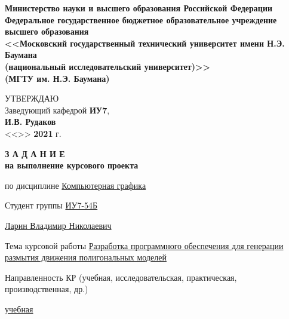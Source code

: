 \thispagestyle{empty}
\begin{center}
    \fontsize{11pt}{0.3\baselineskip}\selectfont \textbf{Министерство науки и высшего образования Российской Федерации \\ Федеральное государственное бюджетное образовательное учреждение \\ высшего образования \\ <<Московский государственный технический университет имени Н.Э. Баумана \\ (национальный исследовательский университет)>> \\ (МГТУ им. Н.Э. Баумана)}
    \makebox[\linewidth]{\rule{\textwidth}{3pt}}
    \begin{flushright}
        \fontsize{11pt}{0.5\baselineskip}\selectfont
            УТВЕРЖДАЮ \\ Заведующий кафедрой \textbf{ИУ7}, \\
            \uline{\mbox{\hspace*{2cm}}}
            \textbf{И.В. Рудаков} \\
            <<\uline{\mbox{\hspace*{1cm}}}>>
            \uline{\mbox{\hspace*{2.5cm}}}
            \textbf{2021} г.
    \end{flushright}
\end{center}


\begin{center}
    \fontsize{18pt}{0.6\baselineskip}\selectfont \textbf{З А Д А Н И Е}\\
    \fontsize{16pt}{0.6\baselineskip}\selectfont \textbf{на выполнение курсового проекта}
\end{center}

\normalsize

\begingroup
\fontsize{12pt}{0.6\baselineskip}\selectfont
\setlength{\parskip}{0.1em}
\setlength{\parindent}{0em}
по дисциплине \uline{\hfill Компьютерная графика \hfill}

Студент группы \uline{\hfill ИУ7-54Б \hfill}

\uline{\hfill Ларин Владимир Николаевич \hfill}

Тема курсовой работы \uline{Разработка   программного   обеспечения   для генерации размытия движения полигональных моделей \hfill}

Направленность КР (учебная, исследовательская, практическая, производственная, др.)

\uline{\hfill учебная \hfill}

